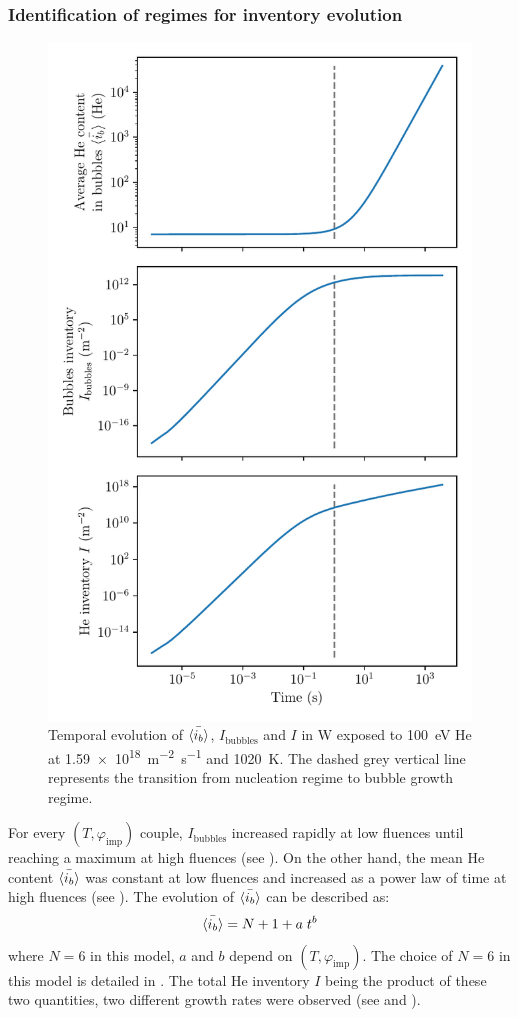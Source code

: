 \subsubsection{Identification of regimes for inventory evolution} 

\begin{figure} [h]
    \centering
    \includegraphics[width=0.75\linewidth]{Figures/Chapter4/parametric study/inventory_bubbles_ib.pdf}
    \caption{Temporal evolution of $\Bar{\langle i_b \rangle}$, $I_\mathrm{bubbles}$ and $I$ in W exposed to \SI{100}{eV} He at \SI{1.59e18}{m^{-2}.s^{-1}} and \SI{1020}{K}. The dashed grey vertical line represents the transition from nucleation regime to bubble growth regime.}
\end{figure}

For every $(T, \varphi_\mathrm{imp})$ couple, $I_\mathrm{bubbles}$ increased rapidly at low \glspl{fluence} until reaching a maximum at high \glspl{fluence} (see ).
On the other hand, the mean He content $\Bar{\langle i_b \rangle}$ was constant at low \glspl{fluence} and increased as a power law of time at high \glspl{fluence} (see ).
The evolution of $\Bar{\langle i_b \rangle}$ can be described as:
\begin{equation}
    \Bar{\langle i_b \rangle} = N + 1 + a \; t^b
    \labeq{ib evolution}
\end{equation}
where $N=6$ in this model, $a$ and $b$ depend on $(T, \varphi_\mathrm{imp})$.
The choice of $N=6$ in this model is detailed in .
The total He inventory $I$ being the product of these two quantities, two different growth rates were observed (see  and ).

